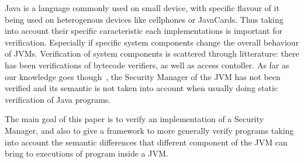 Java is a language commonly used on small device, with specific flavour
of it being used on heterogenous devices like cellphones or JavaCards. 
Thus taking into account their specific caracteristic each implementations
is important for verification.
Especially if specific system components change the overall behaviour of JVMs. 
Verification of system components is scattered through
litterature: there has been verifications of bytecode verifiers, as
well as access contoller. As far as our knowledge goes
though~\cite{HartelMoreau01}, the Security Manager of the JVM 
has not been verified and its semantic is not taken into
account when usually doing static verification of Java programs.


The main goal of this paper is to verify an implementation of a
Security Manager, and also to give a framework to more generally verify
programs taking into account the semantic differences that different
component of the JVM can bring to executions of program inside 
a JVM.

\vspace{-0.4cm}
